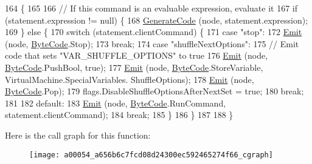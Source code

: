\begin{DoxyCode}
164                                                                      \{
165 
166             \textcolor{comment}{// If this command is an evaluable expression, evaluate it}
167             \textcolor{keywordflow}{if} (statement.expression != null) \{
168                 \hyperlink{a00054_a006f3becd521cc179ba3d3352f6f930b}{GenerateCode} (node, statement.expression);
169             \} \textcolor{keywordflow}{else} \{
170                 \textcolor{keywordflow}{switch} (statement.clientCommand) \{
171                 \textcolor{keywordflow}{case} \textcolor{stringliteral}{"stop"}:
172                     \hyperlink{a00054_a774e8c143cdda0584fcfdda98626a83c}{Emit} (node, \hyperlink{a00051_ad5dfb6ee68ca7469623ad3e459f98894}{ByteCode}.Stop);
173                     \textcolor{keywordflow}{break};
174                 \textcolor{keywordflow}{case} \textcolor{stringliteral}{"shuffleNextOptions"}:
175                     \textcolor{comment}{// Emit code that sets "VAR\_SHUFFLE\_OPTIONS" to true}
176                     \hyperlink{a00054_a774e8c143cdda0584fcfdda98626a83c}{Emit} (node, \hyperlink{a00051_ad5dfb6ee68ca7469623ad3e459f98894}{ByteCode}.PushBool, \textcolor{keyword}{true});
177                     \hyperlink{a00054_a774e8c143cdda0584fcfdda98626a83c}{Emit} (node, \hyperlink{a00051_ad5dfb6ee68ca7469623ad3e459f98894}{ByteCode}.StoreVariable, VirtualMachine.SpecialVariables.
      ShuffleOptions);
178                     \hyperlink{a00054_a774e8c143cdda0584fcfdda98626a83c}{Emit} (node, \hyperlink{a00051_ad5dfb6ee68ca7469623ad3e459f98894}{ByteCode}.Pop);
179                     flags.DisableShuffleOptionsAfterNextSet = \textcolor{keyword}{true};
180                     \textcolor{keywordflow}{break};
181 
182                 \textcolor{keywordflow}{default}:
183                     \hyperlink{a00054_a774e8c143cdda0584fcfdda98626a83c}{Emit} (node, \hyperlink{a00051_ad5dfb6ee68ca7469623ad3e459f98894}{ByteCode}.RunCommand, statement.clientCommand);
184                     \textcolor{keywordflow}{break};
185                 \}
186             \}
187 
188         \}
\end{DoxyCode}


Here is the call graph for this function\-:
\nopagebreak
\begin{figure}[H]
\begin{center}
\leavevmode
\texttt{[image: a00054\_a656b6c7fcd08d24300ec592465274f66\_cgraph]}
\end{center}
\end{figure}


